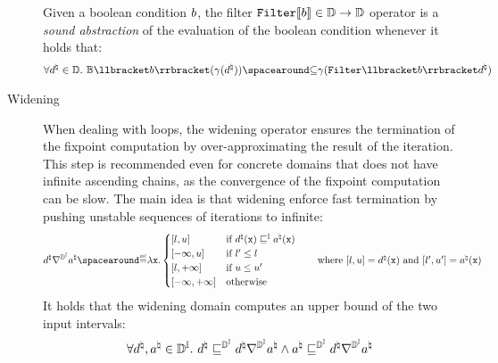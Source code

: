 \begin{description}
  \begin{definition}
    Given a boolean condition $b$, the filter $\textup{\texttt{Filter}} \llbracket b \rrbracket\in\mathbb{D}\to\mathbb{D}$ operator is a \emph{sound abstraction} of the evaluation of the boolean condition whenever it holds that:
  \begin{align*}
    \forall \defabstractvalue\in\abstractdomain.\spacer
    \bexpsemantics
    (\abstractdomainconcretization(\defabstractvalue))
    \SubseteQ
    \abstractdomainconcretization(\abstractdomainfilter \semanticsof{\defbexp}\defabstractvalue)
  \end{align*}
\end{definition}
  \item[Widening]
  When dealing with loops, the widening operator ensures the termination of the fixpoint computation by over-approximating the result of the iteration.
  This step is recommended even for concrete domains that does not have infinite ascending chains, as the convergence of the fixpoint computation can be slow.
  The main idea is that widening enforce fast termination by pushing unstable sequences of iterations to infinite:
  \begin{align*}
    \defabstractvalue \intervalabstractdomainwidening \defotherabstractvalue &\DefeQ \lambda \defvariable.\begin{cases}
      \interval{l}{u} & \text{if } \defabstractvalue(\defvariable) \intervalsubseteq \defotherabstractvalue(\defvariable) \\
      \interval{-\infty}{u} & \text{if } l' \le l \\
      \interval{l}{+\infty} & \text{if } u \le u' \\
      \intervaltop & \text{otherwise}
    \end{cases} \tag*{where $\interval{l}{u} = \defabstractvalue(\defvariable)$ and $\interval{l'}{u'} = \defotherabstractvalue(\defvariable)$}
  \end{align*}
  It holds that the widening domain computes an upper bound of the two input intervals:
  \begin{align*}
    \forall \defabstractvalue, \defotherabstractvalue \in \intervalabstractdomaintype.\spacer \defabstractvalue \intervalabstractdomainsubseteq \defabstractvalue \intervalabstractdomainwidening \defotherabstractvalue \land \defotherabstractvalue \intervalabstractdomainsubseteq \defabstractvalue \intervalabstractdomainwidening \defotherabstractvalue

\end{align*}
\end{description}
